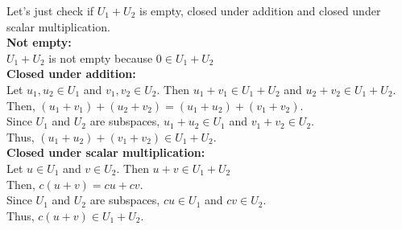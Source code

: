 \documentclass{article}
\begin{document}
Let's just check if \(U_1 + U_2\) is empty, closed under addition and closed under scalar multiplication. \\
\textbf{Not empty:} \\
\(U_1 + U_2\) is not empty because \(0 \in U_1 + U_2\) \\
\textbf{Closed under addition:} \\
Let \(u_1, u_2 \in U_1\) and \(v_1, v_2 \in U_2\). Then \(u_1 + v_1 \in U_1 + U_2\) and \(u_2 + v_2 \in U_1 + U_2\). \\
Then, \((u_1 + v_1) + (u_2 + v_2) = (u_1 + u_2) + (v_1 + v_2)\). \\
Since \(U_1\) and \(U_2\) are subspaces, \(u_1 + u_2 \in U_1\) and \(v_1 + v_2 \in U_2\). \\
Thus, \((u_1 + u_2) + (v_1 + v_2) \in U_1 + U_2\). \\
\textbf{Closed under scalar multiplication:} \\
Let \(u \in U_1\) and \(v \in U_2\). Then \(u + v \in U_1 + U_2\) \\
Then, \(c(u + v) = cu + cv\). \\
Since \(U_1\) and \(U_2\) are subspaces, \(cu \in U_1\) and \(cv \in U_2\). \\
Thus, \(c(u + v) \in U_1 + U_2\). \\
\end{document}
